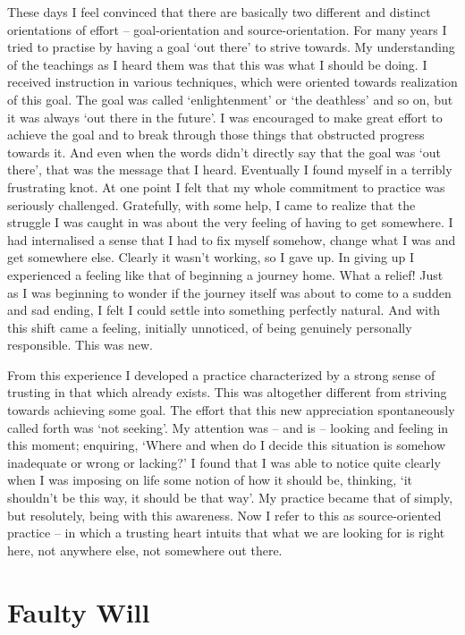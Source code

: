 These days I feel convinced that there are basically two different and
distinct orientations of effort -- goal-orientation and
source-orientation. For many years I tried to practise by having a goal
`out there' to strive towards. My understanding of the teachings as I
heard them was that this was what I should be doing. I received
instruction in various techniques, which were oriented towards
realization of this goal. The goal was called `enlightenment' or `the
deathless' and so on, but it was always `out there in the future'. I was
encouraged to make great effort to achieve the goal and to break through
those things that obstructed progress towards it. And even when the
words didn't directly say that the goal was `out there', that was the
message that I heard. Eventually I found myself in a terribly
frustrating knot. At one point I felt that my whole commitment to
practice was seriously challenged. Gratefully, with some help, I came to
realize that the struggle I was caught in was about the very feeling of
having to get somewhere. I had internalised a sense that I had to fix
myself somehow, change what I was and get somewhere else. Clearly it
wasn't working, so I gave up. In giving up I experienced a feeling like
that of beginning a journey home. What a relief! Just as I was beginning
to wonder if the journey itself was about to come to a sudden and sad
ending, I felt I could settle into something perfectly natural. And with
this shift came a feeling, initially unnoticed, of being genuinely
personally responsible. This was new.

From this experience I developed a practice characterized by a strong
sense of trusting in that which already exists. This was altogether
different from striving towards achieving some goal. The effort that
this new appreciation spontaneously called forth was `not seeking'. My
attention was -- and is -- looking and feeling in this moment;
enquiring, `Where and when do I decide this situation is somehow
inadequate or wrong or lacking?' I found that I was able to notice quite
clearly when I was imposing on life some notion of how it should be,
thinking, `it shouldn't be this way, it should be that way'. My practice
became that of simply, but resolutely, being with this awareness. Now I
refer to this as source-oriented practice -- in which a trusting heart
intuits that what we are looking for is right here, not anywhere else,
not somewhere out there.

\section{Faulty Will}

